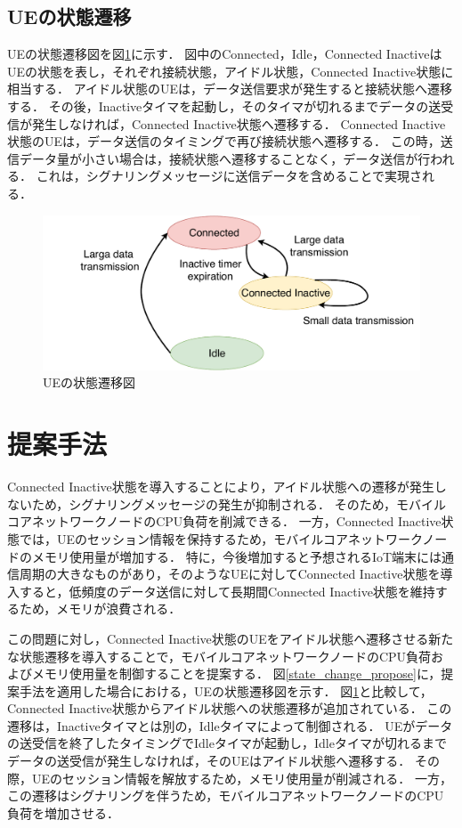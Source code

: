 \documentclass[technicalreport]{ieicej-rev}
\begin{document}
  \subsection{UEの状態遷移}
  UEの状態遷移図を図\ref{state_change_inactive}に示す．
  図中のConnected，Idle，Connected InactiveはUEの状態を表し，それぞれ接続状態，アイドル状態，Connected Inactive状態に相当する．
  アイドル状態のUEは，データ送信要求が発生すると接続状態へ遷移する．
  その後，Inactiveタイマを起動し，そのタイマが切れるまでデータの送受信が発生しなければ，Connected Inactive状態へ遷移する．
  Connected Inactive状態のUEは，データ送信のタイミングで再び接続状態へ遷移する．
  この時，送信データ量が小さい場合は，接続状態へ遷移することなく，データ送信が行われる．
  これは，シグナリングメッセージに送信データを含めることで実現される．
  \begin{figure}[!t]
    \centering
    \includegraphics[width=1.0\hsize]{state_change_inactive.pdf}
    \caption{UEの状態遷移図}
    \label{state_change_inactive}
  \end{figure}


\section{提案手法}
\label{sec:propose}
Connected Inactive状態を導入することにより，アイドル状態への遷移が発生しないため，シグナリングメッセージの発生が抑制される．
そのため，モバイルコアネットワークノードのCPU負荷を削減できる．
一方，Connected Inactive状態では，UEのセッション情報を保持するため，モバイルコアネットワークノードのメモリ使用量が増加する．
特に，今後増加すると予想されるIoT端末には通信周期の大きなものがあり，そのようなUEに対してConnected Inactive状態を導入すると，低頻度のデータ送信に対して長期間Connected Inactive状態を維持するため，メモリが浪費される．

この問題に対し，Connected Inactive状態のUEをアイドル状態へ遷移させる新たな状態遷移を導入することで，モバイルコアネットワークノードのCPU負荷およびメモリ使用量を制御することを提案する．
図\ref{state_change_propose}に，提案手法を適用した場合における，UEの状態遷移図を示す．
図\ref{state_change_inactive}と比較して，Connected Inactive状態からアイドル状態への状態遷移が追加されている．
この遷移は，Inactiveタイマとは別の，Idleタイマによって制御される．
UEがデータの送受信を終了したタイミングでIdleタイマが起動し，Idleタイマが切れるまでデータの送受信が発生しなければ，そのUEはアイドル状態へ遷移する．
その際，UEのセッション情報を解放するため，メモリ使用量が削減される．
一方，この遷移はシグナリングを伴うため，モバイルコアネットワークノードのCPU負荷を増加させる．
\end{document}
